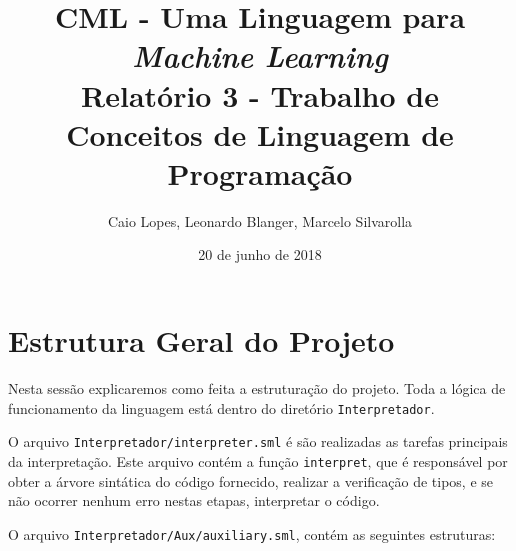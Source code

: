 \documentclass[12pt]{article}
\title{CML - Uma Linguagem para {\it Machine Learning} \\ \Large Relatório 3 - Trabalho de Conceitos de Linguagem de Programação}
\author{Caio Lopes, Leonardo Blanger, Marcelo Silvarolla}
\date{20 de junho de 2018}
\begin{document}
\lstset{
  basicstyle=\ttfamily,
  columns=fullflexible,
  keepspaces=true,
  mathescape
}

\maketitle
\tableofcontents
\newpage
\section{Estrutura Geral do Projeto}

Nesta sessão explicaremos como feita a estruturação do projeto. Toda a lógica de funcionamento da linguagem está dentro do diretório \texttt{Interpretador}.

O arquivo \texttt{Interpretador/interpreter.sml} é são realizadas as tarefas principais da interpretação. Este arquivo contém a função \texttt{interpret}, que é responsável por obter a árvore sintática do código fornecido, realizar a verificação de tipos, e se não ocorrer nenhum erro nestas etapas, interpretar o código.

O arquivo \texttt{Interpretador/Aux/auxiliary.sml}, contém as seguintes estruturas:
\end{document}
